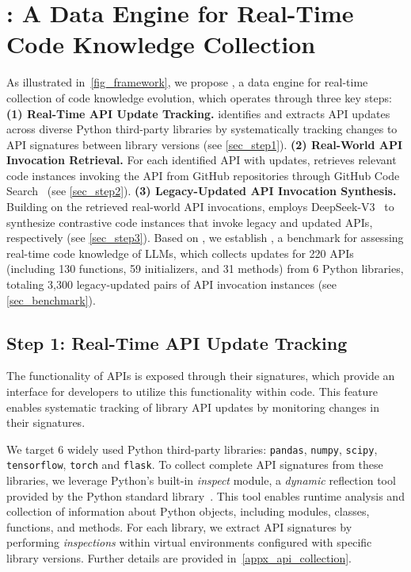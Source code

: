 \section{\dataset: A Data Engine for Real-Time Code Knowledge Collection}

As illustrated in~\autoref{fig_framework}, we propose \method, a data engine for real-time collection of code knowledge evolution, which operates through three key steps:
\textbf{(1) Real-Time API Update Tracking.} 
\method identifies and extracts API updates across diverse Python third-party libraries by systematically tracking changes to API signatures between library versions (see \autoref{sec_step1}). 
\textbf{(2) Real-World API Invocation Retrieval.} For each identified API with updates, \method retrieves relevant code instances invoking the API from GitHub repositories through GitHub Code Search~\cite{github_code_search} (see \autoref{sec_step2}).
\textbf{(3) Legacy-Updated API Invocation Synthesis.} 
Building on the retrieved real-world API invocations, \method employs DeepSeek-V3~\cite{liu2024deepseekv3} to synthesize contrastive code instances that invoke legacy and updated APIs, respectively (see \autoref{sec_step3}).
Based on \method, we establish \benchmark, a benchmark for assessing real-time code knowledge of LLMs, which collects updates for 220 APIs (including 130 functions, 59 initializers, and 31 methods) from 6 Python libraries, totaling 3,300 legacy-updated pairs of API invocation instances (see \autoref{sec_benchmark}).

\subsection{Step 1: Real-Time API Update Tracking}
\label{sec_step1}
The functionality of APIs is exposed through their signatures, which provide an interface for developers to utilize this functionality within code. This feature enables systematic tracking of library API updates by monitoring changes in their signatures.

\vspace{-1em}
We target 6 widely used Python third-party libraries: \texttt{pandas}, \texttt{numpy}, \texttt{scipy}, \texttt{tensorflow}, \texttt{torch} and \texttt{flask}.
To collect complete API signatures from these libraries, we leverage Python's built-in \textit{inspect} module, a \textit{dynamic} reflection tool provided by the Python standard library~\cite{python_inspect}.
This tool enables runtime analysis and collection of information about Python objects, including modules, classes, functions, and methods.
For each library, we extract API signatures by performing \textit{inspections} within virtual environments configured with specific library versions.
Further details are provided in~\cref{appx_api_collection}.

